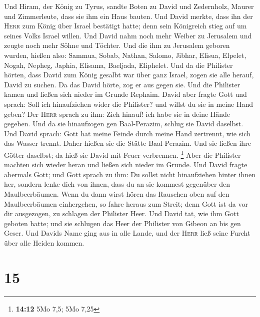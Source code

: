  Und Hiram, der König zu Tyrus, sandte Boten zu David und
Zedernholz, Maurer und Zimmerleute, dass sie ihm ein Haus bauten.
 Und David merkte, dass ihn der \textsc{Herr} zum König
über Israel bestätigt hatte; denn sein Königreich stieg auf um seines
Volks Israel willen.  Und David nahm noch mehr Weiber zu
Jerusalem und zeugte noch mehr Söhne und Töchter.  Und die
ihm zu Jerusalem geboren wurden, hießen also: Sammua, Sobab, Nathan,
Salomo,  Jibhar, Elisua, Elpelet,  Nogah,
Nepheg, Japhia,  Elisama, Baeljada, Eliphelet.
 Und da die Philister hörten, dass David zum König gesalbt
war über ganz Israel, zogen sie alle herauf, David zu suchen. Da das
David hörte, zog er aus gegen sie.  Und die Philister
kamen und ließen sich nieder im Grunde Rephaim.  David
aber fragte Gott und sprach: Soll ich hinaufziehen wider die Philister?
und willst du sie in meine Hand geben? Der \textsc{Herr} sprach zu ihm:
Zieh hinauf! ich habe sie in deine Hände gegeben.  Und da
sie hinaufzogen gen Baal-Perazim, schlug sie David daselbst. Und David
sprach: Gott hat meine Feinde durch meine Hand zertrennt, wie sich das
Wasser trennt. Daher hießen sie die Stätte Baal-Perazim. 
Und sie ließen ihre Götter daselbst; da hieß sie David mit Feuer
verbrennen. \footnote{\textbf{14:12} 5Mo 7,5; 5Mo 7,25} 
Aber die Philister machten sich wieder heran und ließen sich nieder im
Grunde.  Und David fragte abermals Gott; und Gott sprach
zu ihm: Du sollst nicht hinaufziehen hinter ihnen her, sondern lenke
dich von ihnen, dass du an sie kommest gegenüber den Maulbeerbäumen.
 Wenn du dann wirst hören das Rauschen oben auf den
Maulbeerbäumen einhergehen, so fahre heraus zum Streit; denn Gott ist da
vor dir ausgezogen, zu schlagen der Philister Heer.  Und
David tat, wie ihm Gott geboten hatte; und sie schlugen das Heer der
Philister von Gibeon an bis gen Geser.  Und Davids Name
ging aus in alle Lande, und der \textsc{Herr} ließ seine Furcht über
alle Heiden kommen.

\hypertarget{section-14}{%
\section{15}\label{section-14}}


